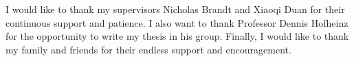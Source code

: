 I would like to thank my supervisors Nicholas Brandt and Xiaoqi Duan for their continuous support and
patience. I also want to thank Professor Dennis Hofheinz for the opportunity to 
write my thesis in his group. Finally, I would like to thank my family and friends for their endless support and encouragement.